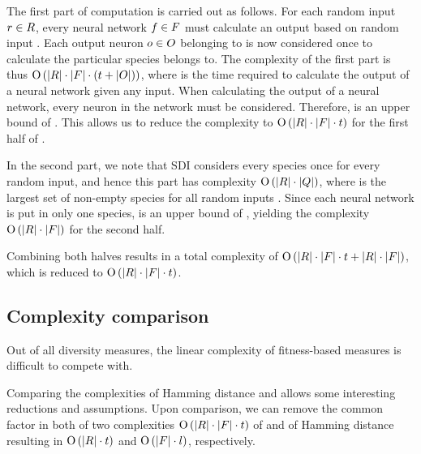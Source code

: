 The first part of computation is carried out as follows. For each random input $r \in R$, every neural network $f \in F$ must calculate an output based on random input \ran. Each output neuron $o \in O$ belonging to \ind{} is now considered once to calculate the particular species \ind{} belongs to. The complexity of the first part is thus $\operatorname{O}\left(\lvert R\rvert \cdot \lvert F\rvert \cdot \left(t + \lvert O\rvert\right)\right)$, where \timet{} is the time required to calculate the output of a neural network given any input. When calculating the output of a neural network, every neuron in the network must be considered. Therefore, \timet{} is an upper bound of \nnoutsetl. This allows us to reduce the complexity to $\operatorname{O}\left(\lvert R\rvert \cdot \lvert F\rvert \cdot t\right)$ for the first half of \dia.

In the second part, we note that SDI considers every species once for every random input, and hence this part has complexity $\operatorname{O}\left(\lvert R\rvert\cdot\lvert Q\rvert\right)$, where \nemptyspeciesset{} is the largest set of non-empty species for all random inputs \ranset. Since each neural network is put in only one species, \indsetl{} is an upper bound of \nemptyspeciessetl, yielding the complexity $\operatorname{O}\left(\lvert R\rvert\cdot\lvert F\rvert\right)$ for the second half.

Combining both halves results in a total complexity of $\operatorname{O}\left(\lvert R\rvert \cdot \lvert F\rvert \cdot t + \lvert R\rvert \cdot \lvert F\rvert\right)$, which is reduced to $\operatorname{O}\left(\lvert R\rvert\cdot\lvert F\rvert\cdot t\right)$.

\subsection{Complexity comparison}
Out of all diversity measures, the linear complexity of fitness-based measures is difficult to compete with.

Comparing the complexities of Hamming distance and \dia{} allows some interesting reductions and assumptions. Upon comparison, we can remove the common factor \indset{} in both of two complexities $\operatorname{O}\left(\lvert R\rvert\cdot\lvert F\rvert\cdot t\right)$ of \dia{} and \bigO{\indsetl^2 \cdot \bitstringl} of Hamming distance resulting in $\operatorname{O}\left(\lvert R\rvert \cdot t\right)$ and $\operatorname{O}\left(\lvert F\rvert \cdot l\right)$, respectively. 

